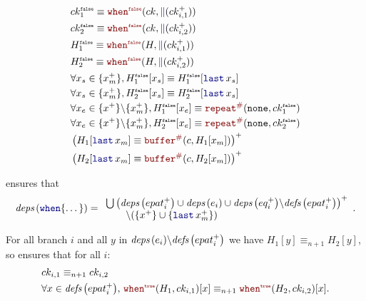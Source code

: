 \begin{skippableproof}
\begin{itemize}
\begin{align*}
                   & ck^\F_1 \equiv \whenF{ck}{\kwf{\Vert}(ck_{i, 1}^+)}                                                                                     \\
                   & ck^\F_2 \equiv \whenF{ck}{\kwf{\Vert}(ck_{i, 2}^+)}                                                                                     \\
                   & H^\F_1 \equiv \whenF{H}{\kwf{\Vert}(ck_{i, 1}^+)}                                                                                       \\
                   & H^\F_2 \equiv \whenF{H}{\kwf{\Vert}(ck_{i, 2}^+)}                                                                                       \\
                   & \forall x_s \in \{x_m^+\}, H^\F_1[x_s] \equiv H^\F_1[\last{x_s}]                                                                        \\
                   & \forall x_s \in \{x_m^+\}, H^\F_2[x_s] \equiv H^\F_2[\last{x_s}]                                                                        \\
                   & \forall x_e \in \{x^+\} \backslash \{x_m^+\}, H^\F_1[x_e] \equiv \const{\none}{ck^\F_1}                                                 \\
                   & \forall x_e \in \{x^+\} \backslash \{x_m^+\}, H^\F_2[x_e] \equiv \const{\none}{ck^\F_2}                                                 \\
                   & \left(H_1[\last{x_m}] \equiv \buffer{c}{H_1[x_m]} \right)^+                                                                             \\
                   & \left(H_2[\last{x_m}] \equiv \buffer{c}{H_2[x_m]} \right)^+
              \end{align*}

               ensures that $$\deps{
                      \kwf{when}\{\dots\}} = \begin{array}{l}
                      \bigcup \left(\deps{epat_i^+} \cup \deps{e_i} \cup \deps{eq_i^+} \backslash \defs{epat_i^+}\right)^+ \\
                      \qquad \backslash (\{x^+\} \cup \{\last{x_m}^+\})
                  \end{array}.$$

              For all branch $i$ and all $y$ in ${\textit{deps}\left(e_i\right)} \backslash {\ensuremath{\textit{defs}\left(epat_i^+\right)}}$ we have
              $H_1[y] \equiv_{n+1} H_2[y]$, so  ensures
              that for all $i$:
              \begin{align*}
                   & ck_{i, 1} \equiv_{n+1} ck_{i, 2}                                         \\
                   & \forall x \in \defs{epat_i^+}, \, \whenT{H_1}{ck_{i, 1}}[x] \equiv_{n+1}
                  \whenT{H_2}{ck_{i, 2}}[x].
              \end{align*}


\end{itemize}
\end{skippableproof}

